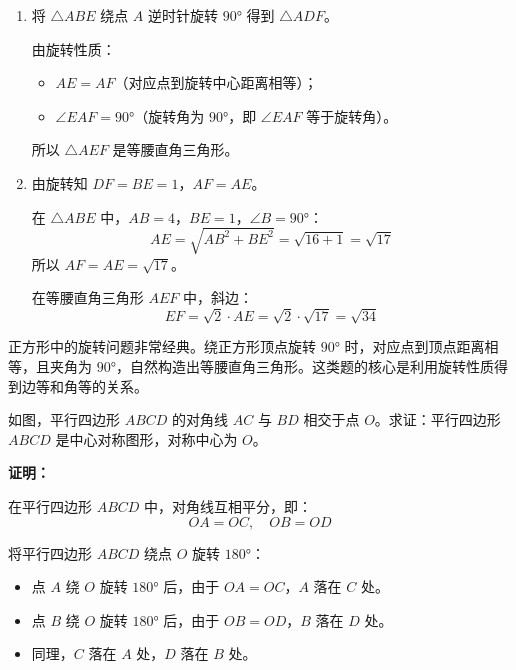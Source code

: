 \documentclass[12pt, a4paper]{ctexart}
\begin{document}
\begin{enumerate}[label=(\arabic*)]
  \item 将 $\triangle ABE$ 绕点 $A$ 逆时针旋转 $90°$ 得到 $\triangle ADF$。

  由旋转性质：
  \begin{itemize}[nosep]
    \item $AE = AF$（对应点到旋转中心距离相等）；
    \item $\angle EAF = 90°$（旋转角为 $90°$，即 $\angle EAF$ 等于旋转角）。
  \end{itemize}

  所以 $\triangle AEF$ 是等腰直角三角形。

  \item 由旋转知 $DF = BE = 1$，$AF = AE$。

  在 $\triangle ABE$ 中，$AB = 4$，$BE = 1$，$\angle B = 90°$：
  \[
  AE = \sqrt{AB^2 + BE^2} = \sqrt{16 + 1} = \sqrt{17}
  \]
  所以 $AF = AE = \sqrt{17}$。

  在等腰直角三角形 $AEF$ 中，斜边：
  \[
  EF = \sqrt{2} \cdot AE = \sqrt{2} \cdot \sqrt{17} = \sqrt{34}
  \]
\end{enumerate}

\begin{tipbox}[方法总结]
正方形中的旋转问题非常经典。绕正方形顶点旋转 $90°$ 时，对应点到顶点距离相等，且夹角为 $90°$，自然构造出等腰直角三角形。这类题的核心是利用旋转性质得到边等和角等的关系。
\end{tipbox}

\vspace{6pt}

\begin{examplebox}[【例题5】中心对称的判定与性质]
如图，平行四边形 $ABCD$ 的对角线 $AC$ 与 $BD$ 相交于点 $O$。求证：平行四边形 $ABCD$ 是中心对称图形，对称中心为 $O$。
\end{examplebox}

\textbf{证明：}

在平行四边形 $ABCD$ 中，对角线互相平分，即：
\[
OA = OC, \quad OB = OD
\]

将平行四边形 $ABCD$ 绕点 $O$ 旋转 $180°$：
\begin{itemize}[nosep]
  \item 点 $A$ 绕 $O$ 旋转 $180°$ 后，由于 $OA = OC$，$A$ 落在 $C$ 处。
  \item 点 $B$ 绕 $O$ 旋转 $180°$ 后，由于 $OB = OD$，$B$ 落在 $D$ 处。
  \item 同理，$C$ 落在 $A$ 处，$D$ 落在 $B$ 处。
\end{itemize}
\end{document}
